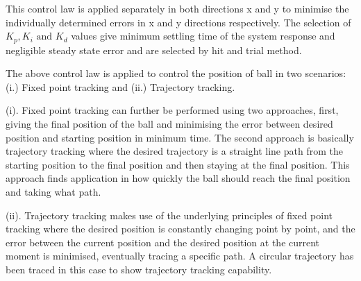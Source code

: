 \documentclass[conference]{IEEEtran}
\begin{document}
This control law is applied separately in both directions x and y to minimise the individually determined errors in x and y directions respectively. The selection of $K_p, K_i \mbox{ and } K_d $ values give minimum settling time of the system response and negligible steady state error and are selected by hit and trial method.

The above control law is applied to control the position of ball in two scenarios: (i.) Fixed point tracking and (ii.) Trajectory tracking.

(i). Fixed point tracking can further be performed using two approaches, first, giving the final position of the ball and minimising the error between desired position and starting position in minimum time. The second approach is basically trajectory tracking where the desired trajectory is a straight line path from the starting position to the final position and then staying at the final position. This approach finds application in how quickly the ball should reach the final position and taking what path.

(ii). Trajectory tracking makes use of the underlying principles of fixed point tracking where the desired position is constantly changing point by point, and the error between the current position and the desired position at the current moment is minimised, eventually tracing a specific path. A circular trajectory has been traced in this case to show trajectory tracking capability.
\end{document}
